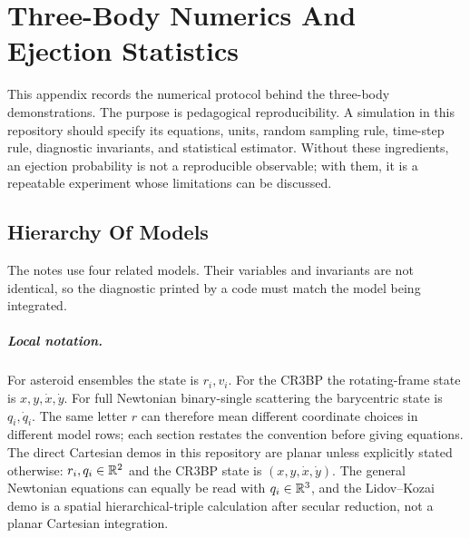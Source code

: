 \chapter{Three-Body Numerics And Ejection Statistics}
\label{app:three-body-numerics}

This appendix records the numerical protocol behind the three-body
demonstrations.  The purpose is pedagogical reproducibility.  A simulation in
this repository should specify its equations, units, random sampling rule,
time-step rule, diagnostic invariants, and statistical estimator.  Without
these ingredients, an ejection probability is not a reproducible observable;
with them, it is a repeatable experiment whose limitations can be discussed.

\section{Hierarchy Of Models}
\label{sec:three-body-model-hierarchy}

The notes use four related models.  Their variables and invariants are not
identical, so the diagnostic printed by a code must match the model being
integrated.

\paragraph{Local notation.}
For asteroid ensembles the state is \(r_i,v_i\).  For the CR3BP the
rotating-frame state is \(x,y,\dot x,\dot y\).  For full Newtonian
binary-single scattering the barycentric state is \(q_i,\dot q_i\).  The same
letter \(r\) can therefore mean different coordinate choices in different
model rows; each section restates the convention before giving equations.
The direct Cartesian demos in this repository are planar unless explicitly
stated otherwise: \(r_i,q_i\in\mathbb{R}^2\) and the CR3BP state is
\((x,y,\dot x,\dot y)\).  The general Newtonian equations can equally be read
with \(q_i\in\mathbb{R}^3\), and the Lidov--Kozai demo is a spatial hierarchical-triple
calculation after secular reduction, not a planar Cartesian integration.

